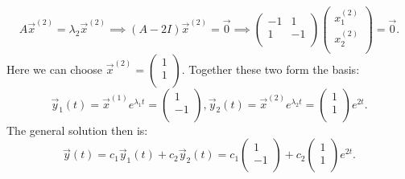 \[ 
A \Vec{x}^{(2)} = \lambda_2 \Vec{x}^{(2)} \implies (A-2I) \Vec{x}^{(2)} = \Vec{0} \implies \begin{pmatrix}
  -1 & 1\\
  1 & -1\\
\end{pmatrix} \begin{pmatrix}
x_1^{(2)}\\
x_2^{(2)}\\
\end{pmatrix} = \Vec{0}
.\]
Here we can choose $\Vec{x}^{(2)} = \begin{pmatrix}
1\\
1\\
\end{pmatrix}$. Together these two form the basis:
\[ 
\Vec{y}_1(t) = \Vec{x}^{(1)} e^{\lambda_1 t} = \begin{pmatrix}
1\\
-1\\
\end{pmatrix}, \Vec{y}_2(t) = \Vec{x}^{(2)} e^{\lambda_2 t} = \begin{pmatrix}
1\\
1\\
\end{pmatrix} e^{2t}
.\]
The general solution then is:
\[ 
\Vec{y}(t) = c_1 \Vec{y}_1(t) + c_2 \Vec{y}_2(t) = c_1 \begin{pmatrix}
1\\
-1\\
\end{pmatrix} + c_2 \begin{pmatrix}
1\\
1\\
\end{pmatrix} e^{2t}
.\]



